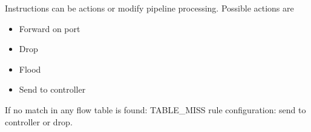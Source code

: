 Instructions can be actions or modify pipeline processing. Possible actions are
\begin{itemize}
	\item Forward on port
	\item Drop
	\item Flood
	\item Send to controller
\end{itemize}

If no match in any flow table is found: TABLE\_MISS rule configuration: send to controller or drop.
